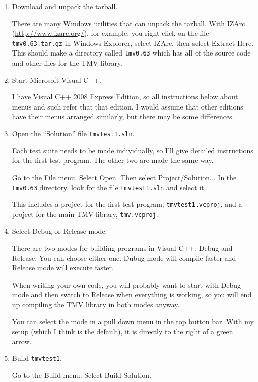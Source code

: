 \documentclass[twoside,letterpaper,11pt]{article}
\newcommand{\tmvversion}{0.63}
\begin{document}
\begin{enumerate}
\item
Download and unpack the tarball.  

There are many Windows utilities that can unpack the
tarball.  With IZArc (\url{http://www.izarc.org/}), for example, you right click on the file 
\texttt{tmv\tmvversion.tar.gz}
in Windows Explorer, select IZArc, then select Extract Here.  This should make a directory
called \texttt{tmv\tmvversion} which has all of the source code and other files for the TMV library.

\item
Start Microsoft Visual C++.  

I have Visual C++ 2008 Express Edition, so all instructions below
about menus and such refer that that edition.  I would assume that other editions have their 
menus arranged similarly, but there may be some differences.

\item
Open the ``Solution'' file \texttt{tmvtest1.sln}.

Each test suite needs to be made individually, so I'll give detailed instructions for the first
test program.  The other two are made the same way.

Go to the File menu.  Select Open.  Then select Project/Solution...
In the \texttt{tmv\tmvversion} directory, look for the file
\texttt{tmvtest1.sln} and select it.  

This includes a project for the first test program, \texttt{tmvtest1.vcproj}, and a project for
the main TMV library, \texttt{tmv.vcproj}.

\item
Select Debug or Release mode.

There are two modes for building programs in Visual C++: Debug and Release.  
You can choose either one.  Dubug mode will compile faster and 
Release mode will execute faster.  

When writing 
your own code, you will probably want to start with Debug mode and then switch to Release
when everything is working, so you will end up compiling the TMV library in both modes anyway.

You can select the mode in a pull down menu in the top button bar.  With my setup
(which I think is the default), it is directly to the right of a green arrow.

\item
Build \texttt{tmvtest1}.

Go to the Build menu.  Select Build Solution.


\end{enumerate}
\end{document}
